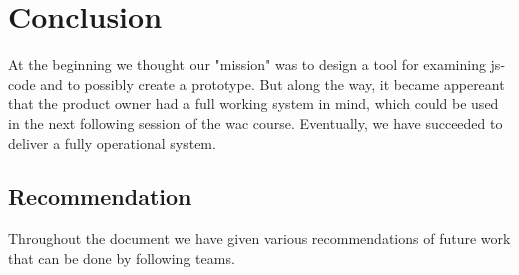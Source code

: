 
\chapter{Conclusion}

At the beginning we thought our "mission" was to design a tool for examining \gls{js-code} and to
possibly create a prototype.
But along the way, it became appereant that the product owner had a full working
system in mind, which could be used in
the next following session of the \gls{wac} course.
Eventually, we have succeeded to deliver a fully operational system.


\section{Recommendation}

Throughout the document we have given various recommendations of future work
that can be done by following teams.
